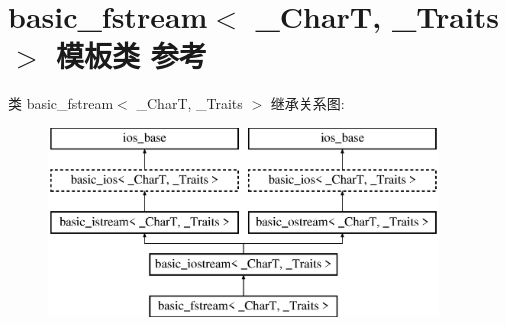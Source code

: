 \hypertarget{classbasic__fstream}{}\section{basic\+\_\+fstream$<$ \+\_\+\+CharT, \+\_\+\+Traits $>$ 模板类 参考}
\label{classbasic__fstream}
类 basic\+\_\+fstream$<$ \+\_\+\+CharT, \+\_\+\+Traits $>$ 继承关系图\+:\begin{figure}[H]
\begin{center}
\leavevmode
\includegraphics[height=5.000000cm]{classbasic__fstream}
\end{center}
\end{figure}
